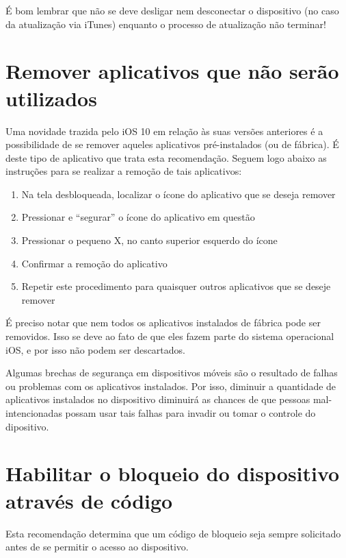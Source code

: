 \'E bom lembrar que n\~ao se deve desligar nem desconectar o dispositivo (no caso da atualiza\c c\~ao via iTunes) enquanto o processo de atualiza\c c\~ao n\~ao terminar!

\section{Remover aplicativos que n\~ao ser\~ao utilizados}

Uma novidade trazida pelo iOS 10 em rela\c c\~ao \`as suas vers\~oes anteriores \'e a possibilidade de se remover aqueles aplicativos pr\'e-instalados (ou de f\'abrica). \'E deste tipo de aplicativo que trata esta recomenda\c c\~ao. Seguem logo abaixo as instru\c c\~oes para se realizar a remo\c c\~ao de tais aplicativos:  

\begin{enumerate}
\item Na tela desbloqueada, localizar o \'icone do aplicativo que se deseja remover
\item Pressionar e ``segurar'' o \'icone do aplicativo em quest\~ao
\item Pressionar o pequeno X, no canto superior esquerdo do \'icone
\item Confirmar a remo\c c\~ao do aplicativo
\item Repetir este procedimento para quaisquer outros aplicativos que se deseje remover
\end{enumerate}

\'E preciso notar que nem todos os aplicativos instalados de f\'abrica pode ser removidos. Isso se deve ao fato de que eles fazem parte do sistema operacional iOS, e por isso n\~ao podem ser descartados. 

Algumas brechas de seguran\c ca em dispositivos m\'oveis s\~ao o resultado de falhas ou problemas com os aplicativos instalados. Por isso, diminuir a quantidade de aplicativos instalados no dispositivo diminuir\'a as chances de que pessoas mal-intencionadas possam usar tais falhas para invadir ou tomar o controle do dipositivo.

\section{Habilitar o bloqueio do dispositivo atrav\'es de c\'odigo}

Esta recomenda\c c\~ao determina que um c\'odigo de bloqueio seja sempre solicitado antes de se permitir o acesso ao dispositivo. 

